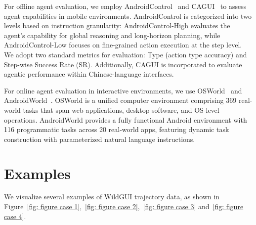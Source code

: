 \documentclass{article}
\theoremstyle{plain}
\theoremstyle{definition}
\theoremstyle{remark}
\newcommand{\ourdataset}{WildGUI}
\begin{document}
For offline agent evaluation, we employ AndroidControl~\citep{li2024effects} and CAGUI~\citep{zhang2025agentcpm} to assess agent capabilities in mobile environments. AndroidControl is categorized into two levels based on instruction granularity: AndroidControl-High evaluates the agent's capability for global reasoning and long-horizon planning, while AndroidControl-Low focuses on fine-grained action execution at the step level. We adopt two standard metrics for evaluation: Type (action type accuracy) and Step-wise Success Rate (SR). Additionally, CAGUI is incorporated to evaluate agentic performance within Chinese-language interfaces.

For online agent evaluation in interactive environments, we use OSWorld~\citep{xie2024osworld} and AndroidWorld~\citep{rawles2024androidworld}. OSWorld is a unified computer environment comprising 369 real-world tasks that span web applications, desktop software, and OS-level operations. AndroidWorld provides a fully functional Android environment with 116 programmatic tasks across 20 real-world apps, featuring dynamic task construction with parameterized natural language instructions.

\section{Examples}
\label{sec: examples}
We visualize several examples of \ourdataset{} trajectory data, as shown in Figure~\ref{fig: figure case 1},~\ref{fig: figure case 2},~\ref{fig: figure case 3} and~\ref{fig: figure case 4}.
\end{document}

